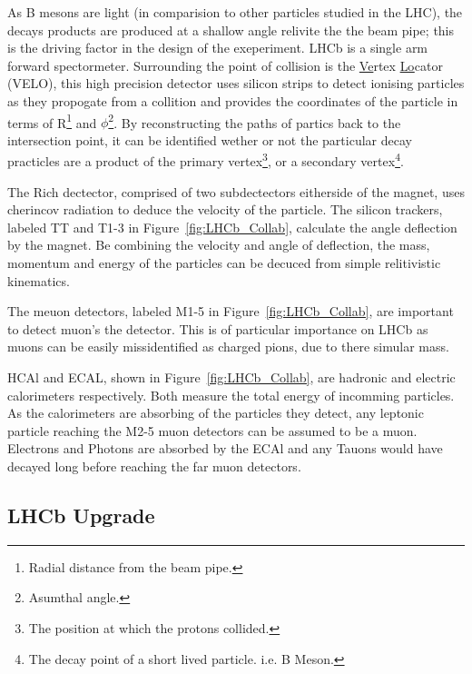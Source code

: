     As B mesons are light (in comparision to other particles studied in the LHC), the decays products are produced at a shallow angle relivite the the beam pipe;
    this is the driving factor in the design of the exeperiment. 
    LHCb is a single arm forward spectormeter.
    Surrounding the point of collision is the \underline{Ve}rtex \underline{Lo}cator (VELO), this high precision detector uses silicon strips to detect ionising particles as they propogate from a collition and provides the coordinates of the particle in terms of R\footnote{Radial distance from the beam pipe.} and $\phi$\footnote{Asumthal angle.}.
    By reconstructing the paths of partics back to the intersection point, it can be identified wether or not the particular decay practicles are a product of the primary vertex\footnote{The position at which the protons collided.}, or a secondary vertex\footnote{The decay point of a short lived particle. i.e. B Meson.}.
    \par
    The Rich dectector, comprised of two subdectectors eitherside of the magnet, uses cherincov radiation to deduce the velocity of the particle. The silicon trackers, labeled TT and T1-3 in Figure~\ref{fig:LHCb_Collab}, calculate the angle deflection by the magnet. Be combining the velocity and angle of deflection, the mass, momentum and energy of the particles can be decuced from simple relitivistic kinematics.
    \par
    The meuon detectors, labeled M1-5 in Figure~\ref{fig:LHCb_Collab}, are important to detect muon's the detector. 
    This is of particular importance on LHCb as muons can be easily missidentified as charged pions, due to there simular mass.
    \par
    HCAl and ECAL, shown in Figure~\ref{fig:LHCb_Collab}, are hadronic and electric calorimeters respectively. 
    Both measure the total energy of incomming particles.
    As the calorimeters are absorbing of the particles they detect, any leptonic particle reaching the M2-5 muon detectors can be assumed to be a muon.
    Electrons and Photons are absorbed by the ECAl and any Tauons would have decayed long before reaching the far muon detectors.

  \subsection{LHCb Upgrade} %
  \label{sub:lhcb_upgrade}

